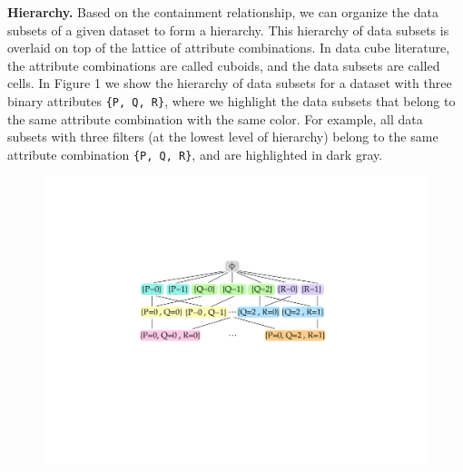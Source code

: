 \textbf{Hierarchy.} Based on the containment relationship, we can organize the data subsets of a given dataset to form a hierarchy. This hierarchy of data subsets is overlaid on top of the lattice of attribute combinations. In data cube literature, the attribute combinations are called cuboids, and the data subsets are called cells. In Figure 1 we show the hierarchy of data subsets for a dataset with three binary attributes {\tt \{P, Q, R\}}, where we highlight the data subsets that belong to the same attribute combination with the same color. For example, all data subsets with three filters (at the lowest level of hierarchy) belong to the same attribute combination {\tt \{P, Q, R\}}, and are highlighted in dark gray. 

\begin{figure}[ht!]
\includegraphics[width=\linewidth]{figures/lattice_formal.pdf}

\end{figure}
